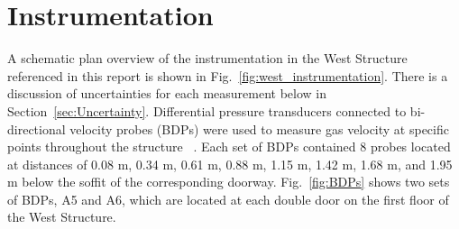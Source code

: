 \documentclass[12pt,oneside]{book}
\begin{document}
\clearpage

\section{Instrumentation}
\label{sec:Instrumentation}
A schematic plan overview of the instrumentation in the West Structure referenced in this report is shown in Fig.~\ref{fig:west_instrumentation}. There is a discussion of uncertainties for each measurement below in Section~\ref{sec:Uncertainty}. Differential pressure transducers connected to bi-directional velocity probes (BDPs) were used to measure gas velocity at specific points throughout the structure ~\cite{McCaffrey:Combustion_and_Flame}. Each set of BDPs contained 8 probes located at distances of 0.08 m, 0.34 m, 0.61 m, 0.88 m, 1.15 m, 1.42 m, 1.68 m, and 1.95 m below the soffit of the corresponding doorway. Fig.~\ref{fig:BDPs} shows two sets of BDPs, A5 and A6, which are located at each double door on the first floor of the West Structure.
\end{document}
